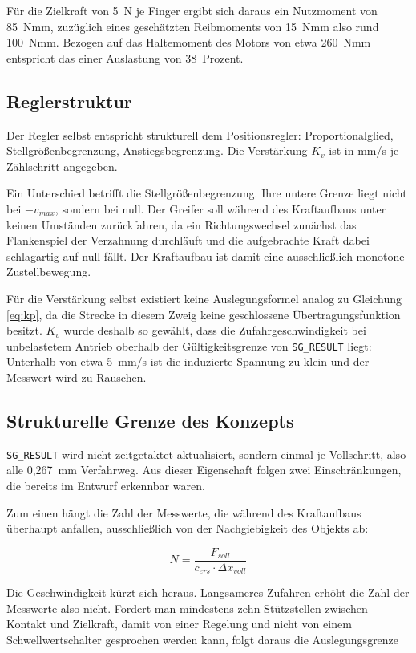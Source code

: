 Für die Zielkraft von 5~N je Finger ergibt sich daraus ein Nutzmoment von 85~Nmm,
zuzüglich eines geschätzten Reibmoments von 15~Nmm also rund 100~Nmm. Bezogen auf das
Haltemoment des Motors von etwa 260~Nmm entspricht das einer Auslastung von 38~Prozent.

\subsection*{Reglerstruktur}

Der Regler selbst entspricht strukturell dem Positionsregler: Proportionalglied,
Stellgrößenbegrenzung, Anstiegsbegrenzung. Die Verstärkung $K_v$ ist in mm/s je Zählschritt
angegeben.

Ein Unterschied betrifft die Stellgrößenbegrenzung. Ihre untere Grenze liegt nicht bei
$-v_{max}$, sondern bei null. Der Greifer soll während des Kraftaufbaus unter keinen
Umständen zurückfahren, da ein Richtungswechsel zunächst das Flankenspiel der Verzahnung
durchläuft und die aufgebrachte Kraft dabei schlagartig auf null fällt. Der Kraftaufbau
ist damit eine ausschließlich monotone Zustellbewegung.

Für die Verstärkung selbst existiert keine Auslegungsformel analog zu Gleichung
\ref{eq:kp}, da die Strecke in diesem Zweig keine geschlossene Übertragungsfunktion
besitzt. $K_v$ wurde deshalb so gewählt, dass die Zufahrgeschwindigkeit bei unbelastetem
Antrieb oberhalb der Gültigkeitsgrenze von \texttt{SG\_RESULT} liegt: Unterhalb von etwa
5~mm/s ist die induzierte Spannung zu klein und der Messwert wird zu Rauschen.

\subsection*{Strukturelle Grenze des Konzepts}

\texttt{SG\_RESULT} wird nicht zeitgetaktet aktualisiert, sondern einmal je Vollschritt,
also alle 0,267~mm Verfahrweg. Aus dieser Eigenschaft folgen zwei Einschränkungen, die
bereits im Entwurf erkennbar waren.

Zum einen hängt die Zahl der Messwerte, die während des Kraftaufbaus überhaupt anfallen,
ausschließlich von der Nachgiebigkeit des Objekts ab:

\begin{equation}
    N = \frac{F_{soll}}{c_{ers} \cdot \Delta x_{voll}}
    \label{eq:messwerte}
\end{equation}

Die Geschwindigkeit kürzt sich heraus. Langsameres Zufahren erhöht die Zahl der Messwerte
also nicht. Fordert man mindestens zehn Stützstellen zwischen Kontakt und Zielkraft, damit
von einer Regelung und nicht von einem Schwellwertschalter gesprochen werden kann, folgt
daraus die Auslegungsgrenze

